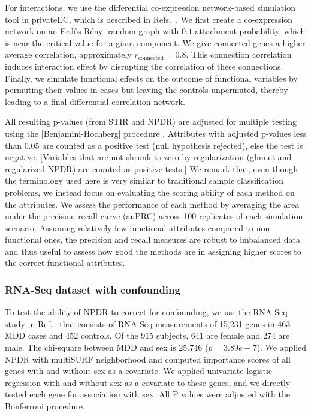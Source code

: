\documentclass[10pt]{article}
\begin{document}
For interactions, we use the differential co-expression network-based simulation tool in privateEC, which is described in Refs.~\cite{le17, lareau15}. 
We first create a co-expression network on an Erd\H{o}s-R\'enyi random graph with $0.1$ attachment probability, which is near the critical value for a giant component.
We give connected genes a higher average correlation, approximately $r_{\text{connected}}=0.8$. %
This connection correlation induces interaction effect by disrupting the correlation of these connections. %
Finally, we simulate functional effects on the outcome of functional variables by permuting their values in cases but leaving the controls unpermuted, thereby leading to a final differential correlation network. 

All resulting p-values (from STIR and NPDR) are adjusted for multiple testing using the [Benjamini-Hochberg] procedure \cite{benjamini01}.
Attributes with adjusted p-values less than 0.05 are counted as a positive test (null hypothesis rejected), else the test is negative.
[Variables that are not shrunk to zero by regularization (glmnet and regularized NPDR) are counted as positive tests.]
We remark that, even though the terminology used here is very similar to traditional sample classification problems, we instead focus on evaluating the scoring ability of each method on the attributes.
We assess the performance of each method by averaging the area under the precision-recall curve (auPRC) across 100 replicates of each simulation scenario.
Assuming relatively few functional attributes compared to non-functional ones, the precision and recall measures are robust to imbalanced data and thus useful to assess how good the methods are in assigning higher scores to the correct functional attributes.


\subsubsection{RNA-Seq dataset with confounding}
To test the ability of NPDR to correct for confounding, we use the RNA-Seq study in Ref.~\cite{mostafavi14} that consists of RNA-Seq measurements of 15,231 genes in 463 MDD cases and 452 controls.
Of the 915 subjects, 641 are female and 274 are male.
The chi-square between MDD and sex is $25.746$ ($p=3.89e-7$).
We applied NPDR with multiSURF neighborhood and computed importance scores of all genes with and without sex as a covariate. 
We applied univariate logistic regression with and without sex as a covariate to these genes, and we directly tested each gene for association with sex.
All P values were adjusted with the Bonferroni procedure.
\end{document}
